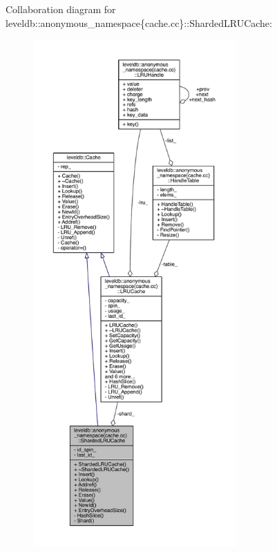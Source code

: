 Collaboration diagram for leveldb\+:\+:anonymous\+\_\+namespace\{cache.\+cc\}\+:\+:Sharded\+L\+R\+U\+Cache\+:
\nopagebreak
\begin{figure}[H]
\begin{center}
\leavevmode
\includegraphics[height=550pt]{classleveldb_1_1anonymous__namespace_02cache_8cc_03_1_1_sharded_l_r_u_cache__coll__graph}
\end{center}
\end{figure}

